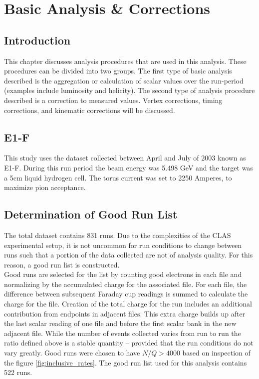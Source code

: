 \chapter{Basic Analysis \& Corrections}

\section{Introduction}
This chapter discusses analysis procedures that are used in this analysis.  These procedures can be divided into two groups.  The first type of basic analysis described is the aggregation or calculation of scalar values over the run-period (examples include luminosity and helicity).  The second type of analysis procedure described is a correction to measured values.  Vertex corrections, timing corrections, and kinematic corrections will be discussed.

\section{E1-F}
This study uses the dataset collected between April and July of 2003 known as E1-F.  During this run period the beam energy was 5.498 GeV and the target was a 5cm liquid hydrogen cell.  The torus current was set to 2250 Amperes, to maximize pion acceptance.

\section{Determination of Good Run List}
The total dataset contains 831 runs.  Due to the complexities of the CLAS experimental setup, it is not uncommon for run conditions to change between runs such that a portion of the data collected are not of analysis quality.  For this reason, a good run list is constructed. \\

Good runs are selected for the list by counting good electrons in each file and normalizing by the accumulated charge for the associated file.  For each file, the difference between subsequent Faraday cup readings is summed to calculate the charge for the file.  Creation of the total charge for the run includes an additional contribution from endpoints in adjacent files.  This extra charge builds up after the last scalar reading of one file and before the first scalar bank in the new adjacent file.  While the number of events collected varies from run to run the ratio defined above is a stable quantity -- provided that the run conditions do not vary greatly.  Good runs were chosen to have $N/Q > 4000$ based on inspection of the figure \ref{fig:inclusive_rates}.  The good run list used for this analysis contains 522 runs.  

